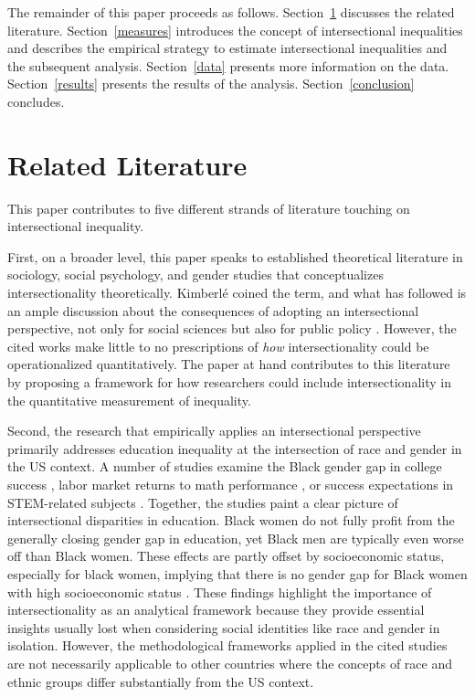 The remainder of this paper proceeds as follows. Section~\ref{sec:literature} discusses the related literature. Section~\ref{measures} introduces the concept of intersectional inequalities and describes the empirical strategy to estimate intersectional inequalities and the subsequent analysis. Section~\ref{data} presents more information on the data. Section~\ref{results} presents the results of the analysis. Section~\ref{conclusion} concludes.

\section{Related Literature}\label{sec:literature}

This paper contributes to five different strands of literature touching on intersectional inequality. 

First, on a broader level, this paper speaks to established theoretical literature in sociology, social psychology, and gender studies that conceptualizes intersectionality theoretically. Kimberlé \cite{crenshaw1989} coined the term, and what has followed is an ample discussion about the consequences of adopting an intersectional perspective, not only for social sciences but also for public policy \citep[to name just a few examples:][]{alexander-floyd2012, berger2010, bowleg2008, cho2013, choo2010, few-demo2014, hancock2007, shields2008, strid2013, walby2012}. However, the cited works make little to no prescriptions of \textit{how} intersectionality could be operationalized quantitatively. The paper at hand contributes to this literature by proposing a framework for how researchers could include intersectionality in the quantitative measurement of inequality.

Second, the research that empirically applies an intersectional perspective primarily addresses education inequality at the intersection of race and gender in the US context. A number of studies examine the Black gender gap in college success \citep{Keels2013, McDaniel2011, Mittleman2021}, labor market returns to math performance \citep{Riegle-Crumb2006}, or success expectations in STEM-related subjects \citep[][review article]{Parker2020}. Together, the studies paint a clear picture of intersectional disparities in education. Black women do not fully profit from the generally closing gender gap in education, yet Black men are typically even worse off than Black women. These effects are partly offset by socioeconomic status, especially for black women, implying that there is no gender gap for Black women with high socioeconomic status \citep{Keels2013}. These findings highlight the importance of intersectionality as an analytical framework because they provide essential insights usually lost when considering social identities like race and gender in isolation. However, the methodological frameworks applied in the cited studies are not necessarily applicable to other countries where the concepts of race and ethnic groups differ substantially from the US context.

